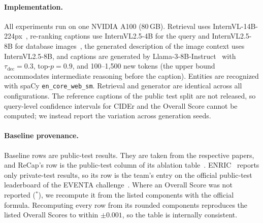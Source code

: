 \documentclass[runningheads]{llncs}
\DeclareRobustCommand{\aciids}[1]{{\color{olive}#1}}
\DeclareRobustCommand{\revise}[1]{{\color{olive}#1}}
\DeclareRobustCommand{\todo}[1]{\ifblank{#1}%
     {{\color{blue}\textbf{[TBD]}}}%
     {{\color{blue}\textbf{[#1]}}}}
\DeclareRobustCommand{\aciids}[1]{#1}
\DeclareRobustCommand{\revise}[1]{#1}
\DeclareRobustCommand{\todo}[1]{\PackageError{revision}{Unresolved TODO}{}}
\begin{document}
\paragraph{Implementation.}
All experiments run on one NVIDIA A100 (80\,GB). Retrieval uses InternVL-14B-224px~\cite{chen2024internvl}, re-ranking \aciids{captions} use \revise{InternVL2.5-4B for the query and InternVL2.5-8B for database images}~\cite{chen2024internvl25}, \revise{the generated description of the image context uses InternVL2.5-8B,} and captions are generated by Llama-3-8B-Instruct~\cite{meta_llama_3} with \revise{$\tau_{\mathrm{dec}}{=}0.3$}, top-$p{=}0.9$, and 100--1{,}500 new tokens (the upper bound accommodates intermediate reasoning before the caption). Entities are recognized with spaCy \texttt{en\_core\_web\_sm}. Retrieval and generator are identical across all configurations. \revise{The reference captions of the public test split are not released, so query-level confidence intervals for CIDEr and the Overall Score cannot be computed; we instead report the variation across generation seeds.}

\revise{\paragraph{Baseline provenance.} Baseline rows are public-test results. They are taken from the respective papers, and ReCap's row is the public-test column of its ablation table~\cite{recap}. ENRIC~\cite{enric} reports only private-test results, so its row is the team's entry on the official public-test leaderboard of the EVENTA challenge~\cite{eventa_challenge}. Where an Overall Score was not reported ($^{\ast}$), we recompute it from the listed components with the official formula. Recomputing every row from its rounded components reproduces the listed Overall Scores to within $\pm0.001$, so the table is internally consistent.}

\end{document}

